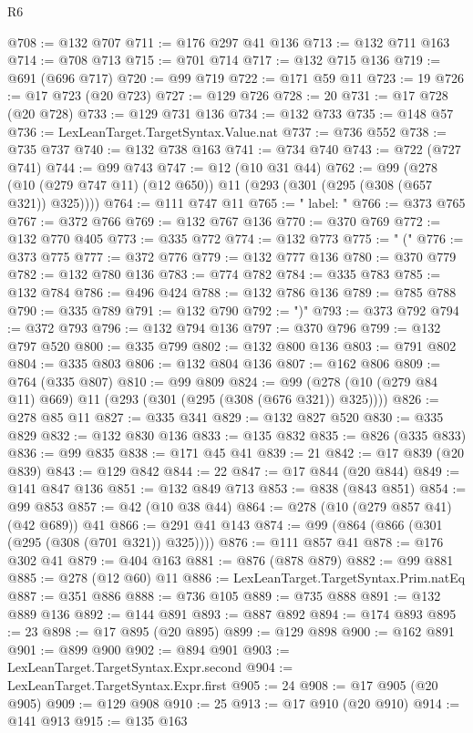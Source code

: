 \begin{lexlean}{R6}
\begin{coremodule}
@708 := @132 @707
@711 := @176 @297 @41 @136
@713 := @132 @711 @163
@714 := @708 @713
@715 := @701 @714
@717 := @132 @715 @136
@719 := @691 (@696 @717)
@720 := @99 @719
@722 := @171 @59 @11
@723 := 19
@726 := @17 @723 (@20 @723)
@727 := @129 @726
@728 := 20
@731 := @17 @728 (@20 @728)
@733 := @129 @731 @136
@734 := @132 @733
@735 := @148 @57
@736 := LexLeanTarget.TargetSyntax.Value.nat
@737 := @736 @552
@738 := @735 @737
@740 := @132 @738 @163
@741 := @734 @740
@743 := @722 (@727 @741)
@744 := @99 @743
@747 := @12 (@10 @31 @44)
@762 := @99 (@278 (@10 (@279 @747 @11) (@12 @650)) @11 (@293 (@301 (@295 (@308 (@657 @321)) @325))))
@764 := @111 @747 @11
@765 := "  label: "
@766 := @373 @765
@767 := @372 @766
@769 := @132 @767 @136
@770 := @370 @769
@772 := @132 @770 @405
@773 := @335 @772
@774 := @132 @773
@775 := " ("
@776 := @373 @775
@777 := @372 @776
@779 := @132 @777 @136
@780 := @370 @779
@782 := @132 @780 @136
@783 := @774 @782
@784 := @335 @783
@785 := @132 @784
@786 := @496 @424
@788 := @132 @786 @136
@789 := @785 @788
@790 := @335 @789
@791 := @132 @790
@792 := ")"
@793 := @373 @792
@794 := @372 @793
@796 := @132 @794 @136
@797 := @370 @796
@799 := @132 @797 @520
@800 := @335 @799
@802 := @132 @800 @136
@803 := @791 @802
@804 := @335 @803
@806 := @132 @804 @136
@807 := @162 @806
@809 := @764 (@335 @807)
@810 := @99 @809
@824 := @99 (@278 (@10 (@279 @84 @11) @669) @11 (@293 (@301 (@295 (@308 (@676 @321)) @325))))
@826 := @278 @85 @11
@827 := @335 @341
@829 := @132 @827 @520
@830 := @335 @829
@832 := @132 @830 @136
@833 := @135 @832
@835 := @826 (@335 @833)
@836 := @99 @835
@838 := @171 @45 @41
@839 := 21
@842 := @17 @839 (@20 @839)
@843 := @129 @842
@844 := 22
@847 := @17 @844 (@20 @844)
@849 := @141 @847 @136
@851 := @132 @849 @713
@853 := @838 (@843 @851)
@854 := @99 @853
@857 := @42 (@10 @38 @44)
@864 := @278 (@10 (@279 @857 @41) (@42 @689)) @41
@866 := @291 @41 @143
@874 := @99 (@864 (@866 (@301 (@295 (@308 (@701 @321)) @325))))
@876 := @111 @857 @41
@878 := @176 @302 @41
@879 := @404 @163
@881 := @876 (@878 @879)
@882 := @99 @881
@885 := @278 (@12 @60) @11
@886 := LexLeanTarget.TargetSyntax.Prim.natEq
@887 := @351 @886
@888 := @736 @105
@889 := @735 @888
@891 := @132 @889 @136
@892 := @144 @891
@893 := @887 @892
@894 := @174 @893
@895 := 23
@898 := @17 @895 (@20 @895)
@899 := @129 @898
@900 := @162 @891
@901 := @899 @900
@902 := @894 @901
@903 := LexLeanTarget.TargetSyntax.Expr.second
@904 := LexLeanTarget.TargetSyntax.Expr.first
@905 := 24
@908 := @17 @905 (@20 @905)
@909 := @129 @908
@910 := 25
@913 := @17 @910 (@20 @910)
@914 := @141 @913
@915 := @135 @163

\end{coremodule}
\end{lexlean}
